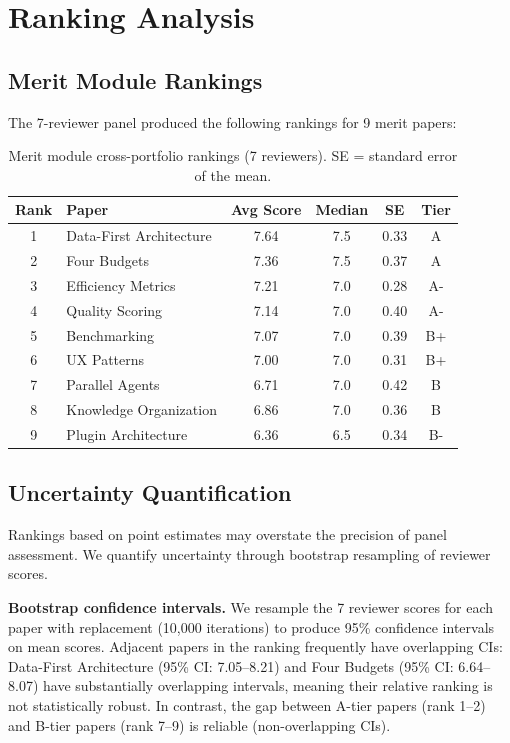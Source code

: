 \section{Ranking Analysis}

\subsection{Merit Module Rankings}

The 7-reviewer panel produced the following rankings for 9 merit papers:

\begin{table}[h]
\centering
\small
\begin{tabular}{clcccc}
\toprule
Rank & Paper & Avg Score & Median & SE & Tier \\
\midrule
1 & Data-First Architecture & 7.64 & 7.5 & 0.33 & A \\
2 & Four Budgets & 7.36 & 7.5 & 0.37 & A \\
3 & Efficiency Metrics & 7.21 & 7.0 & 0.28 & A- \\
4 & Quality Scoring & 7.14 & 7.0 & 0.40 & A- \\
5 & Benchmarking & 7.07 & 7.0 & 0.39 & B+ \\
6 & UX Patterns & 7.00 & 7.0 & 0.31 & B+ \\
7 & Parallel Agents & 6.71 & 7.0 & 0.42 & B \\
8 & Knowledge Organization & 6.86 & 7.0 & 0.36 & B \\
9 & Plugin Architecture & 6.36 & 6.5 & 0.34 & B- \\
\bottomrule
\end{tabular}
\caption{Merit module cross-portfolio rankings (7 reviewers). SE = standard error of the mean.}
\end{table}

\subsection{Uncertainty Quantification}
\label{sec:uncertainty}

Rankings based on point estimates may overstate the precision of panel assessment. We quantify uncertainty through bootstrap resampling of reviewer scores.

\textbf{Bootstrap confidence intervals.} We resample the 7 reviewer scores for each paper with replacement (10,000 iterations) to produce 95\% confidence intervals on mean scores. Adjacent papers in the ranking frequently have overlapping CIs: Data-First Architecture (95\% CI: 7.05--8.21) and Four Budgets (95\% CI: 6.64--8.07) have substantially overlapping intervals, meaning their relative ranking is not statistically robust. In contrast, the gap between A-tier papers (rank 1--2) and B-tier papers (rank 7--9) is reliable (non-overlapping CIs).

